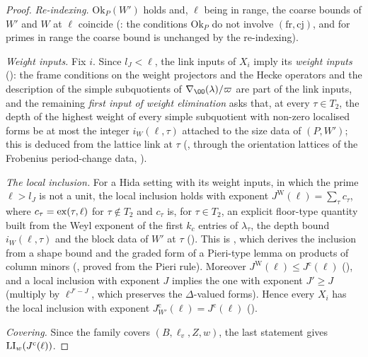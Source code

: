 \begin{proof}
\emph{Re-indexing.} $\mathrm{Ok}_P(W')$ holds and, $\ell$ being in range, the coarse bounds of $W'$ and $W$ at $\ell$ coincide
(: the conditions $\mathrm{Ok}_P$ do not involve $(\mathrm{fr},\mathrm{cj})$, and for primes in range
the coarse bound is unchanged by the re-indexing).

\emph{Weight inputs.} Fix $i$. Since $l_J<\ell$, the link inputs of $X_i$ imply its \emph{weight inputs}
(): the frame conditions on the weight
projectors and the Hecke operators and the description of the simple subquotients of $\nabla_\OO(\lambda)/\varpi$ are part of the link
inputs, and the remaining \emph{first input of weight elimination} asks that, at every $\tau\in T_2$, the depth of the highest weight
of every simple subquotient with non-zero localised forms be at most the integer $i_W(\ell,\tau)$ attached to the size data of
$(P,W')$; this is deduced from the lattice link at $\tau$ (,
through the orientation lattices of the Frobenius period-change data,
).

\emph{The local inclusion.} For a Hida setting with its weight inputs, in which the prime $\ell>l_J$ is not a unit, the local inclusion
holds with exponent $J^{\mathrm W}(\ell)=\sum_\tau c_\tau$, where $c_\tau=\operatorname{ex}(\tau,\ell)$ for $\tau\notin T_2$ and $c_\tau$ is, for
$\tau\in T_2$, an explicit floor-type quantity built from the Weyl exponent of the first $k_c$ entries of $\lambda_\tau$, the depth
bound $i_W(\ell,\tau)$ and the block data of $W'$ at $\tau$ (). This is
, which derives the inclusion from a shape bound and
the graded form of a Pieri-type lemma on products of column minors
(, proved from the Pieri rule). Moreover $J^{\mathrm W}(\ell)\le J^{\mathrm c}(\ell)$
(), and a local inclusion with exponent $J$ implies the one with
exponent $J'\ge J$ (multiply by $\ell^{J'-J}$, which preserves the $\Delta$-valued forms). Hence every $X_i$ has the local inclusion with
exponent $J^{\mathrm c}_{W'}(\ell)=J^{\mathrm c}(\ell)$ ().

\emph{Covering.} Since the family covers $(B,\ell_v,Z,w)$, the last statement gives $\mathrm{LI}_w(J^{\mathrm c}(\ell))$.
\end{proof}

